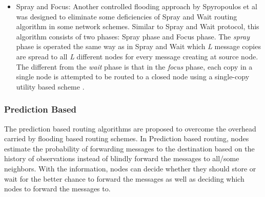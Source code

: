 \begin{itemize}
\begin{itemize}
		\item Spray and Focus: Another controlled flooding approach by Spyropoulos et al \cite{Spyropoulos2007} was designed to eliminate some deficiencies of Spray and Wait routing algorithm in some network schemes.
		Similar to Spray and Wait protocol, this algorithm consists of two phases: Spray phase and Focus phase.
		The \emph{spray} phase is operated the same way as in Spray and Wait which \emph{L} message copies are spread to all \emph{L} different nodes for every message creating at source node.
		The different from the \emph{wait} phase is that in the \emph{focus} phase, each copy in a single node is attempted to be routed to a closed node using a single-copy utility based scheme \cite{Spyropoulos2008}.
	 
	\end{itemize}
\end{itemize}


\subsubsection{Prediction Based }
The prediction based routing algorithms are proposed to overcome the overhead carried by flooding based routing schemes. In Prediction based routing, nodes estimate the probability of forwarding messages to the destination based on the history of observations instead of blindly forward the messages to all/some neighbors. 
With the information, nodes can decide whether they should store or wait for the better chance to forward the messages as well as deciding which nodes to forward the messages to.

